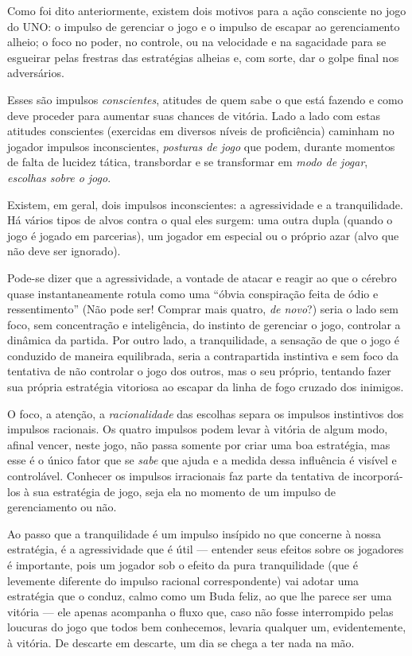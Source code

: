 Como foi dito anteriormente, existem dois motivos para a ação consciente no jogo do UNO: o impulso de gerenciar o jogo e o impulso de escapar ao gerenciamento alheio; o foco no poder, no controle, ou na velocidade e na sagacidade para se esgueirar pelas frestras das estratégias alheias e, com sorte, dar o golpe final nos adversários.

Esses são impulsos \textit{conscientes}, atitudes de quem sabe o que está fazendo e como deve proceder para aumentar suas chances de vitória. Lado a lado com estas atitudes conscientes (exercidas em diversos níveis de proficiência) caminham no jogador impulsos inconscientes, \textit{posturas de jogo} que podem, durante momentos de falta de lucidez tática, transbordar e se transformar em \textit{modo de jogar}, \textit{escolhas sobre o jogo}.

Existem, em geral, dois impulsos inconscientes: a agressividade e a tranquilidade. Há vários tipos de alvos contra o qual eles surgem: uma outra dupla (quando o jogo é jogado em parcerias), um jogador em especial ou o próprio azar (alvo que não deve ser ignorado).

Pode-se dizer que a agressividade, a vontade de atacar e reagir ao que o cérebro quase instantaneamente rotula como uma ``óbvia conspiração feita de ódio e ressentimento'' (Não pode ser! Comprar mais quatro, \textit{de novo}?) seria o lado sem foco, sem concentração e inteligência, do instinto de gerenciar o jogo, controlar a dinâmica da partida. Por outro lado, a tranquilidade, a sensação de que o jogo é conduzido de maneira equilibrada, seria a contrapartida instintiva e sem foco da tentativa de não controlar o jogo dos outros, mas o seu próprio, tentando fazer sua própria estratégia vitoriosa ao escapar da linha de fogo cruzado dos inimigos.

O foco, a atenção, a \textit{racionalidade} das escolhas separa os impulsos instintivos dos impulsos racionais. Os quatro impulsos podem levar à vitória de algum modo, afinal vencer, neste jogo, não passa somente por criar uma boa estratégia, mas esse é o único fator que se \textit{sabe} que ajuda e a medida dessa influência é visível e controlável. Conhecer os impulsos irracionais faz parte da tentativa de incorporá-los à sua estratégia de jogo, seja ela no momento de um impulso de gerenciamento ou não.

Ao passo que a tranquilidade é um impulso insípido no que concerne à nossa estratégia, é a agressividade que é útil --- entender seus efeitos sobre os jogadores é importante, pois um jogador sob o efeito da pura tranquilidade (que é levemente diferente do impulso racional correspondente) vai adotar uma estratégia que o conduz, calmo como um Buda feliz, ao que lhe parece ser uma vitória --- ele apenas acompanha o fluxo que, caso não fosse interrompido pelas loucuras do jogo que todos bem conhecemos, levaria qualquer um, evidentemente, à vitória. De descarte em descarte, um dia se chega a ter nada na mão.

